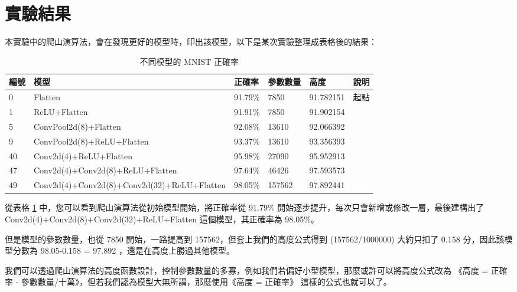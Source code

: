 \documentclass{article}
\begin{document}
\section{實驗結果}

本實驗中的爬山演算法，會在發現更好的模型時，印出該模型，以下是某次實驗整理成表格後的結果：

\begin{table}
 \caption{不同模型的 MNIST 正確率}
  \centering
  \begin{tabular}{llllll}
    編號 & 模型     & 正確率     & 參數數量 & 高度    & 說明 \\
    \midrule
    0  & Flatten & 91.79\% & 7850 & 91.782151 & 起點\\
    1   & ReLU+Flatten & 91.91\% & 7850 & 91.902154  \\
    5   & ConvPool2d(8)+Flatten & 92.08\% & 13610 & 92.066392 \\
    9   & ConvPool2d(8)+ReLU+Flatten & 93.37\% & 13610 & 93.356393      \\
    40  & Conv2d(4)+ReLU+Flatten & 95.98\% & 27090 & 95.952913       \\
    47  & Conv2d(4)+Conv2d(8)+ReLU+Flatten & 97.64\% & 46426 & 97.593573       \\
    49  & Conv2d(4)+Conv2d(8)+Conv2d(32)+ReLU+Flatten & 98.05\% & 157562 & 97.892441 \\
    \bottomrule
  \end{tabular}
  \label{table:experiment1}
\end{table}

從表格 \ref{table:experiment1} 中，您可以看到爬山演算法從初始模型開始，將正確率從 91.79\% 開始逐步提升，每次只會新增或修改一層，最後建構出了 Conv2d(4)+Conv2d(8)+Conv2d(32)+ReLU+Flatten 這個模型，其正確率為 98.05\%。

但是模型的參數數量，也從 7850 開始，一路提高到 157562，但套上我們的高度公式得到 (157562/1000000) 大約只扣了 0.158 分，因此該模型分數為 98.05-0.158 = 97.892 ，還是在高度上勝過其他模型。

我們可以透過爬山演算法的高度函數設計，控制參數數量的多寡，例如我們若偏好小型模型，那麼或許可以將高度公式改為 《高度 = 正確率 - 參數數量/十萬》，但若我們認為模型大無所謂，那麼使用《高度 = 正確率》 這樣的公式也就可以了。


\renewcommand\refname{參考文獻}

  


\begin{thebibliography}{1}


\end{thebibliography}
\end{document}
